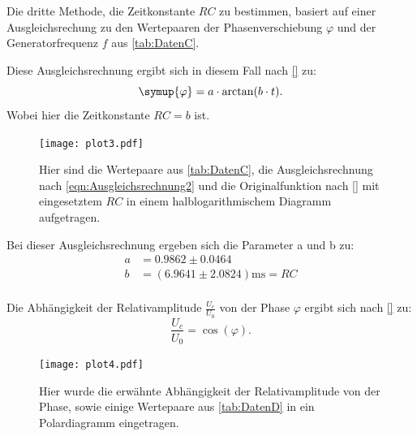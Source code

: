 Die dritte Methode, die Zeitkonstante $RC$ zu bestimmen, basiert auf einer Ausgleichsrechung zu den Wertepaaren der Phasenverschiebung $\varphi$ 
und der Generatorfrequenz $f$ aus \autoref{tab:DatenC}.


Diese Ausgleichsrechnung ergibt sich in diesem Fall nach \eqref{} zu:
\begin{equation}
  \label{eqn:Ausgleichsrechnung2}
  \symup{\varphi} = a\cdot\arctan(b\cdot t).
\end{equation}
Wobei hier die Zeitkonstante $RC = b$ ist.
\begin{figure}
  \centering
  \texttt{[image: plot3.pdf]}
  \caption{Hier sind die Wertepaare aus \autoref{tab:DatenC}, die Ausgleichsrechnung nach \eqref{eqn:Ausgleichsrechnung2} und die Originalfunktion nach \eqref{} mit eingesetztem $RC$ in einem halblogarithmischem Diagramm aufgetragen.}
  \label{fig:plot3}
\end{figure}
Bei dieser Ausgleichsrechnung ergeben sich die Parameter a und b zu:
\begin{align*}
  a &=0.9862\pm 0.0464 \\
  b &=(6.9641\pm 2.0824) \unit{\milli\second} = RC \\
\end{align*}

Die Abhängigkeit der Relativamplitude $\frac{U_c}{U_0}$ von der Phase $\varphi$ ergibt sich nach \eqref{} zu:
\begin{equation*}
  \frac{U_c}{U_0} = \cos\left(\varphi\right).
\end{equation*}

\begin{figure}
  \centering
  \texttt{[image: plot4.pdf]}
  \caption{Hier wurde die erwähnte Abhängigkeit der Relativamplitude von der Phase, sowie einige Wertepaare aus \autoref{tab:DatenD} in ein Polardiagramm eingetragen.}
  \label{fig:plot4}
\end{figure}

